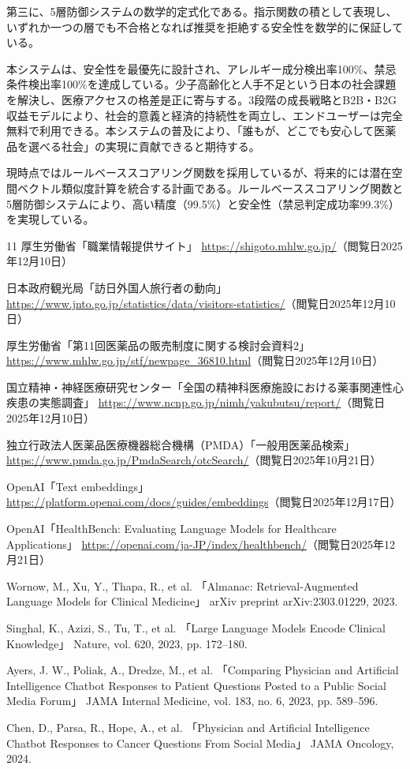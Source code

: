\documentclass[a4paper,11pt,ja=standard,xelatex]{bxjsarticle}
\theoremstyle{definition}
\begin{document}
第三に、5層防御システムの数学的定式化である。指示関数の積として表現し、いずれか一つの層でも不合格となれば推奨を拒絶する安全性を数学的に保証している。

本システムは、安全性を最優先に設計され、アレルギー成分検出率100\%、禁忌条件検出率100\%を達成している。少子高齢化と人手不足という日本の社会課題を解決し、医療アクセスの格差是正に寄与する。3段階の成長戦略とB2B・B2G収益モデルにより、社会的意義と経済的持続性を両立し、エンドユーザーは完全無料で利用できる。本システムの普及により、「誰もが、どこでも安心して医薬品を選べる社会」の実現に貢献できると期待する。

現時点ではルールベーススコアリング関数を採用しているが、将来的には潜在空間ベクトル類似度計算を統合する計画である。ルールベーススコアリング関数と5層防御システムにより、高い精度（99.5\%）と安全性（禁忌判定成功率99.3\%）を実現している。


\newpage
\begin{thebibliography}{11}
厚生労働省「職業情報提供サイト」
\url{https://shigoto.mhlw.go.jp/}（閲覧日2025年12月10日）

日本政府観光局「訪日外国人旅行者の動向」
\url{https://www.jnto.go.jp/statistics/data/visitors-statistics/}（閲覧日2025年12月10日）

厚生労働省「第11回医薬品の販売制度に関する検討会資料2」
\url{https://www.mhlw.go.jp/stf/newpage_36810.html}（閲覧日2025年12月10日）

国立精神・神経医療研究センター「全国の精神科医療施設における薬事関連性心疾患の実態調査」
\url{https://www.ncnp.go.jp/nimh/yakubutsu/report/}（閲覧日2025年12月10日）

独立行政法人医薬品医療機器総合機構（PMDA）「一般用医薬品検索」
\url{https://www.pmda.go.jp/PmdaSearch/otcSearch/}（閲覧日2025年10月21日）

OpenAI「Text embeddings」
\url{https://platform.openai.com/docs/guides/embeddings}（閲覧日2025年12月17日）

OpenAI「HealthBench: Evaluating Language Models for Healthcare Applications」
\url{https://openai.com/ja-JP/index/healthbench/}（閲覧日2025年12月21日）

Wornow, M., Xu, Y., Thapa, R., et al. 
「Almanac: Retrieval-Augmented Language Models for Clinical Medicine」
arXiv preprint arXiv:2303.01229, 2023.

Singhal, K., Azizi, S., Tu, T., et al. 
「Large Language Models Encode Clinical Knowledge」
Nature, vol. 620, 2023, pp. 172--180.

Ayers, J. W., Poliak, A., Dredze, M., et al. 
「Comparing Physician and Artificial Intelligence Chatbot Responses to Patient Questions Posted to a Public Social Media Forum」
JAMA Internal Medicine, vol. 183, no. 6, 2023, pp. 589--596.

Chen, D., Parsa, R., Hope, A., et al. 
「Physician and Artificial Intelligence Chatbot Responses to Cancer Questions From Social Media」
JAMA Oncology, 2024.

\end{thebibliography}
\end{document}
